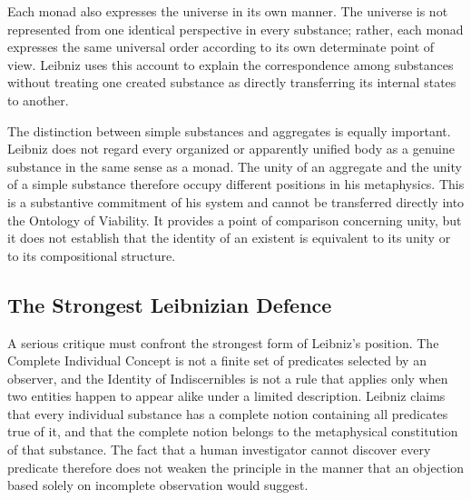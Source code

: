 Each monad also expresses the universe in
its own manner. The universe is not represented
from one identical perspective in every
substance; rather, each monad expresses the
same universal order according to its own
determinate point of view. Leibniz uses this
account to explain the correspondence among
substances without treating one created
substance as directly transferring its
internal states to another. \cite[§§56--57]{LeibnizMonadology}

\label{para:VS.B01.P01.C08.S07.SS06.P005}

The distinction between simple substances
and aggregates is equally important.
Leibniz does not regard every organized
or apparently unified body as a genuine
substance in the same sense as a monad.
The unity of an aggregate and the unity
of a simple substance therefore occupy
different positions in his metaphysics.
This is a substantive commitment of his
system and cannot be transferred directly
into the Ontology of Viability. It provides
a point of comparison concerning unity,
but it does not establish that the identity
of an existent is equivalent to its unity
or to its compositional structure. \cite{LookLeibnizSEP2020}



\subsection{The Strongest Leibnizian Defence}
\label{subsec:ch08-leibniz-strongest-defence}

\label{para:VS.B01.P01.C08.S07.SS07.P001}

A serious critique must confront the strongest
form of Leibniz's position. The Complete Individual
Concept is not a finite set of predicates selected
by an observer, and the Identity of Indiscernibles
is not a rule that applies only when two entities
happen to appear alike under a limited description.
Leibniz claims that every individual substance
has a complete notion containing all predicates
true of it, and that the complete notion belongs
to the metaphysical constitution of that substance.
The fact that a human investigator cannot discover
every predicate therefore does not weaken the
principle in the manner that an objection based
solely on incomplete observation would suggest.
\cite[§§8--9]{LeibnizDiscourse}
\cite{LookLeibnizSEP2020}

